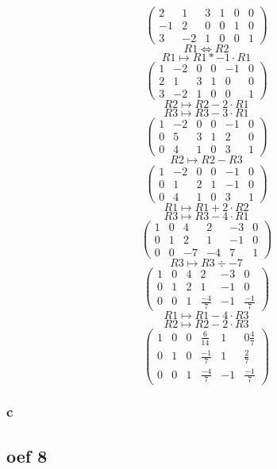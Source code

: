 \documentclass[10pt,a4paper]{article}
\begin{document}
\[
\begin{pmatrix}
2 & 1 & 3 & 1 & 0 & 0\\
-1 & 2 & 0 & 0 & 1 & 0\\
3 & -2 & 1 & 0 & 0 & 1
\end{pmatrix}
\]   
\[ R1 \Leftrightarrow R2 \]
\[ R1 \longmapsto R1 * -1\cdot R1\]
\[
\begin{pmatrix}
1 & -2 & 0 & 0 & -1 & 0\\
2 & 1 & 3 & 1 & 0 & 0\\
3 & -2 & 1 & 0 & 0 & 1
\end{pmatrix}
\]
\[ R2 \longmapsto R2 - 2\cdot R1 \]
\[ R3 \longmapsto R3 - 3\cdot R1 \]
\[
\begin{pmatrix}
1 & -2 & 0 & 0 & -1 & 0\\
0 & 5 & 3 & 1 & 2 & 0\\
0 & 4 & 1 & 0 & 3 & 1
\end{pmatrix}
\]
\[ R2 \longmapsto R2 - R3 \]
\[
\begin{pmatrix}
1 & -2 & 0 & 0 & -1 & 0\\
0 & 1 & 2 & 1 & -1 & 0\\
0 & 4 & 1 & 0 & 3 & 1
\end{pmatrix}
\]
\[ R1 \longmapsto R1 + 2\cdot R2 \]
\[ R3 \longmapsto R3 - 4\cdot R1 \]
\[
\begin{pmatrix}
1 & 0 & 4 & 2 & -3 & 0\\
0 & 1 & 2 & 1 & -1 & 0\\
0 & 0 & -7 & -4 & 7 & 1
\end{pmatrix}
\]
\[ R3 \longmapsto R3 \div -7  \]
\[
\begin{pmatrix}
1 & 0 & 4 & 2 & -3 & 0\\
0 & 1 & 2 & 1 & -1 & 0\\
0 & 0 & 1 & \frac{-4}{7} & -1 & \frac{-1}{7}
\end{pmatrix}
\]
\[ R1 \longmapsto R1  - 4 \cdot R3 \]
\[ R2 \longmapsto R2 - 2 \cdot R3 \]
\[
\begin{pmatrix}
1 & 0 & 0 & \frac{6}{14} & 1 & 0\frac{4}{7}\\
0 & 1 & 0 & \frac{-1}{7} & 1 & \frac{2}{7}\\
0 & 0 & 1 & \frac{-4}{7} & -1 & \frac{-1}{7}
\end{pmatrix}
\]
\subsubsection*{c}


\subsection*{oef 8}
\end{document}
